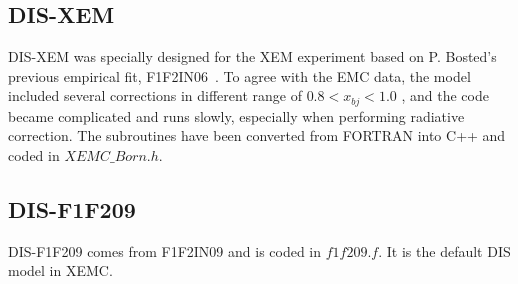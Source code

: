 \subsection{DIS-XEM}
 DIS-XEM was specially designed for the XEM experiment based on P. Bosted's previous empirical fit, F1F2IN06~\cite{Bosted:2006}. To agree with the EMC data, the model included several corrections in different range of $0.8<x_{bj}<1.0$ , and the code became complicated and runs slowly, especially when performing radiative correction. The subroutines have been converted from FORTRAN into C++ and coded in \emph{$XEMC\_Born.h$}. 

\subsection{DIS-F1F209}
 DIS-F1F209 comes from F1F2IN09 and is coded in $f1f209.f$. It is the default DIS model in XEMC.

